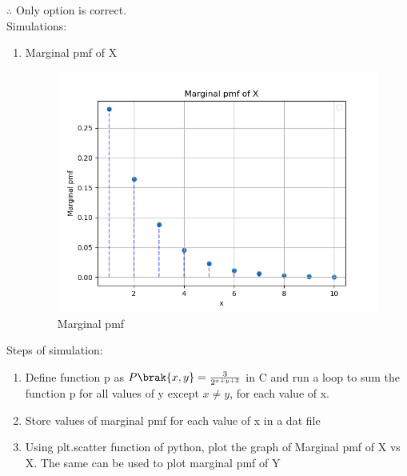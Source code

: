 \documentclass[journal,12pt,twocolumn]{IEEEtran}
\theoremstyle{remark}
\begin{document}
$\therefore$ Only option  is correct. \\
Simulations:
\begin{enumerate}
\item Marginal pmf of X
\begin{figure}[H]
\includegraphics[width=\columnwidth]{2023/ST/47/figs/pmfx.png}
\caption{Marginal pmf}
\label{fig:i_pmf}
\end{figure}
\end{enumerate}
Steps of simulation:
\begin{enumerate}
\item Define function p as $P\brak{x,y}=\frac{3}{2^{x+y+3}}$ in C and run a loop to sum the function p for all values of y except $x\neq y$, for each value of x.
\item Store values of marginal pmf for each value of x in a dat file 
\item Using plt.scatter function of python, plot the graph of Marginal pmf of X vs X.
The same can be used to plot marginal pmf of Y
\end{enumerate}
\end{document}
